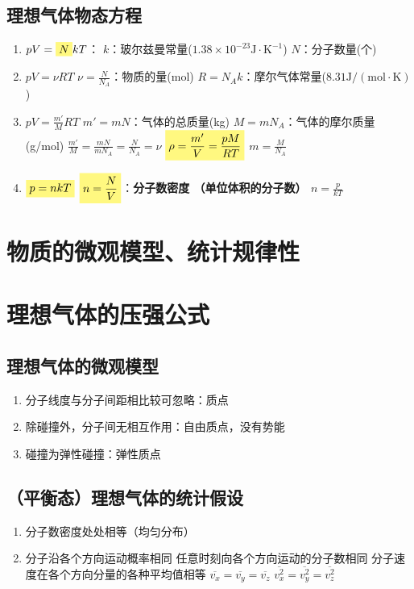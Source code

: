 \documentclass[UTF8,a4paper,12pt,scheme=chinese]{ctexbook}
\newcommand{\hla}[1]{%
	\colorbox{yellow!50}{$\displaystyle#1$}}
\begin{document}
	\subsection{理想气体物态方程}
	\begin{enumerate}
		\item $pV=\hla{N}kT$：
		\subitem $k$：玻尔兹曼常量($\mathrm{1.38\times10^{-23}J\cdot K^{-1}}$)
		\subitem $N$：分子数量(个)
		\item $pV=\nu RT$
		\subitem $\nu = \frac{N}{N_A}$：物质的量(mol)
		\subitem $R=N_Ak$：摩尔气体常量($\mathrm{8.31\mathrm{J}/(mol\cdot K)}$)
		\item $pV=\frac{m'}{M}RT$
		\subitem $m'=mN$：气体的总质量(kg)
		\subitem $M=mN_A$：气体的摩尔质量(g/mol)
		\subitem $\frac{m'}{M}=\frac{mN}{mN_A}=\frac{N}{N_A}=\nu$
		\subitem $\hla{\rho=\frac{m'}{V}=\frac{pM}{RT}}$
		\subitem $m=\frac{M}{N_A}$
		\item $\hla{p=nkT}$
		\subitem $\hla{n=\frac{N}{V}}$：\bfseries{分子数密度} （单位体积的分子数）
		\subitem $n=\frac{p}{kT}$
	\end{enumerate}
	\section{物质的微观模型、统计规律性}
	\section{理想气体的压强公式}
	\subsection{理想气体的微观模型}
	\begin{enumerate}
		\item 分子线度与分子间距相比较可忽略：质点
		\item 除碰撞外，分子间无相互作用：自由质点，没有势能
		\item 碰撞为弹性碰撞：弹性质点
	\end{enumerate}
	\subsection{（平衡态）理想气体的统计假设}
	\begin{enumerate}
		\item 分子数密度处处相等（均匀分布）
		\item 分子沿各个方向运动概率相同
		\subitem 任意时刻向各个方向运动的分子数相同
		\subitem 分子速度在各个方向分量的各种平均值相等
		\subsubitem $\overline{v_x}=\overline{v_y}=\overline{v_z}$
		\subsubitem $\overline{v^2_x}=\overline{v^2_y}=\overline{v^2_z}$
	\end{enumerate}
\end{document}
